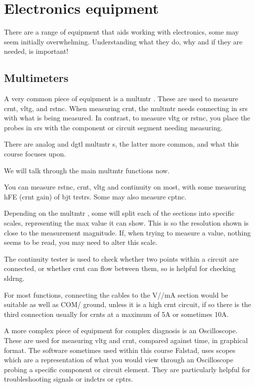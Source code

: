 \documentclass[a4paper,11pt]{report}
\begin{document}
\section{Electronics equipment}

There are a range of equipment that aids working with electronics, some may seem initially overwhelming. Understanding what they do, why and if they are needed, is important!

\vspace*{1\baselineskip}

\subsection{Multimeters}

A very common piece of equipment is a \gls{multmtr} . These are used to measure \gls{crnt}, \gls{vltg}, and \gls{rstnc}. When measuring \gls{crnt}, the \gls{multmtr} needs connecting in \gls{srs} with what is being measured. In contrast, to measure \gls{vltg} or \gls{rstnc}, you place the probes in \gls{srs} with the component or circuit segment needing measuring.

There are analog and \gls{dgtl} \gls{multmtr} s, the latter more common, and what this course focuses upon.

We will talk through the main \gls{multmtr} functions now.

You can measure \gls{rstnc}, \gls{crnt}, \gls{vltg} and continuity on most, with some measuring hFE (\gls{crnt} gain) of \gls{bjt} \gls{trstr}s. Some may also measure \gls{cptnc}.

Depending on the \gls{multmtr} , some will split each of the sections into specific scales, representing the max value it can show. This is so the resolution shown is close to the measurement magnitude. If, when trying to measure a value, nothing seems to be read, you may need to alter this scale.

The continuity tester is used to check whether two points within a circuit are connected, or whether \gls{crnt} can flow between them, so is helpful for checking \gls{sldrng}.

For most functions, connecting the cables to the V/\ohm/mA section would be suitable as well as COM/ ground, unless it is a high \gls{crnt} circuit, if so there is the third connection usually for \gls{crnt}s at a maximum of 5A or sometimes 10A.

A more complex piece of equipment for complex diagnosis is an Oscilloscope. These are used for measuring \gls{vltg} and \gls{crnt}, compared against time, in graphical format. The software sometimes used within this course Falstad, uses scopes which are a representation of what you would view through an Oscilloscope probing a specific component or circuit element. They are particularly helpful for troubleshooting signals or \gls{indctr}s or \gls{cptr}s.
\end{document}
